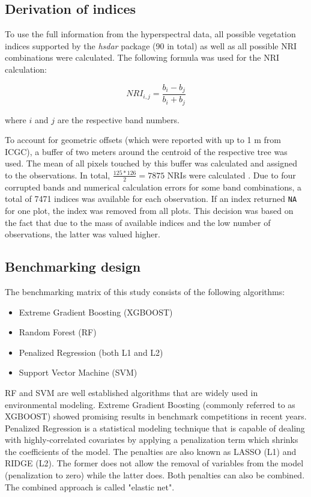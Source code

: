 \documentclass[review]{elsarticle}
\begin{document}
\subsection{Derivation of indices}
\noindent To use the full information from the hyperspectral data, all possible vegetation indices supported by the \textit{hsdar} package (90 in total) as well as all possible \ac{NRI} combinations were calculated.
The following formula was used for the NRI calculation:

\begin{equation}
	NRI_{i,j} = \frac{b_{i} - b_{j}}{b_{i} + b_{j}}
\end{equation}

\noindent
where $i$ and $j$ are the respective band numbers.

\bigbreak

\noindent To account for geometric offsets (which were reported with up to 1 m from \ac{ICGC}), a buffer of two meters around the centroid of the respective tree was used.
The mean of all pixels touched by this buffer was calculated and assigned to the observations.
In total, $\frac{125*126}{2} = 7875$ NRIs were calculated .
Due to four corrupted bands and numerical calculation errors for some band combinations, a total of 7471 indices was available for each observation.
If an index returned \texttt{NA} for one plot, the index was removed from all plots.
This decision was based on the fact that due to the mass of available indices and the low number of observations, the latter was valued higher.

\subsection{Benchmarking design}

The benchmarking matrix of this study consists of the following algorithms:

\begin{itemize}
	\item  Extreme Gradient Boosting (\ac{XGBOOST})
	\item  Random Forest (\ac{RF})
	\item  Penalized Regression (both L1 and L2)
	\item  Support Vector Machine (\ac{SVM})
\end{itemize}

\ac{RF} and {SVM} are well established algorithms that are widely used in environmental modeling.
Extreme Gradient Boosting (commonly referred to as \ac{XGBOOST}) showed promising results in benchmark competitions in recent years.
Penalized Regression is a statistical modeling technique that is capable of dealing with highly-correlated covariates by applying a penalization term which shrinks the coefficients of the model.
The penalties are also known as LASSO (L1) and RIDGE (L2).
The former does not allow the removal of variables from the model (penalization to zero) while the latter does.
Both penalties can also be combined.
The combined approach is called "elastic net".
\end{document}
